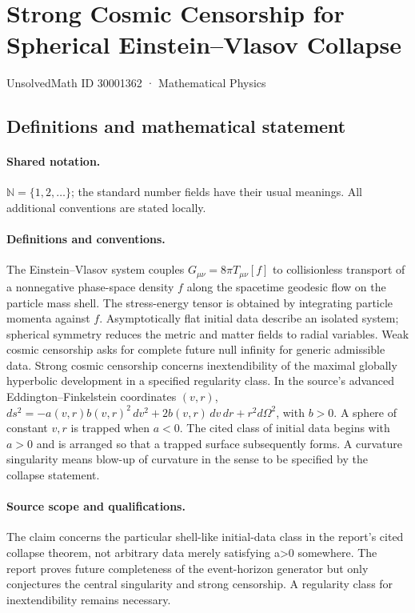 \documentclass[11pt]{article}
\begin{document}
\setcounter{section}{30001361}
\section{Strong Cosmic Censorship for Spherical Einstein–Vlasov Collapse}\label{30001362}
{\small UnsolvedMath ID 30001362 · Mathematical Physics}
\subsection{Definitions and mathematical statement}

\paragraph{Shared notation.}$\mathbb N=\{1,2,\ldots\}$; the standard number fields have their usual meanings. All additional conventions are stated locally.


\paragraph{Definitions and conventions.} The Einstein--Vlasov system couples $G_{\mu\nu}=8\pi T_{\mu\nu}[f]$ to collisionless transport of a nonnegative phase-space density $f$ along the spacetime geodesic flow on the particle mass shell. The stress-energy tensor is obtained by integrating particle momenta against $f$. Asymptotically flat initial data describe an isolated system; spherical symmetry reduces the metric and matter fields to radial variables. Weak cosmic censorship asks for complete future null infinity for generic admissible data. Strong cosmic censorship concerns inextendibility of the maximal globally hyperbolic development in a specified regularity class. In the source's advanced Eddington--Finkelstein coordinates $(v,r)$, $ds^2=-a(v,r)b(v,r)^2\,dv^2+2b(v,r)\,dv\,dr+r^2d\Omega^2$, with $b>0$. A sphere of constant $v,r$ is trapped when $a<0$. The cited class of initial data begins with $a>0$ and is arranged so that a trapped surface subsequently forms. A curvature singularity means blow-up of curvature in the sense to be specified by the collapse statement.

\paragraph{Source scope and qualifications.} The claim concerns the particular shell-like initial-data class in the report's cited collapse theorem, not arbitrary data merely satisfying a>0 somewhere. The report proves future completeness of the event-horizon generator but only conjectures the central singularity and strong censorship. A regularity class for inextendibility remains necessary.
\end{document}
